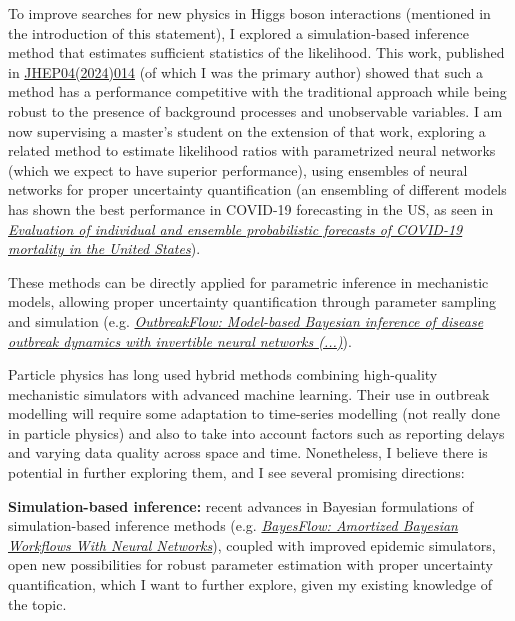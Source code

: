 \documentclass[11pt, a4paper]{awesome-cv}
\begin{document}
\begin{cvletter}
To improve searches for new physics in Higgs boson interactions (mentioned in the introduction of this statement), I explored a simulation-based inference method that estimates sufficient statistics of the likelihood. This work, published in \href{http://dx.doi.org/10.1007/JHEP04(2024)014}{JHEP04(2024)014} (of which I was the primary author) showed that such a method has a performance competitive with the traditional approach while being robust to the presence of background processes and unobservable variables. I am now supervising a master's student on the extension of that work, exploring a related method to estimate likelihood ratios with parametrized neural networks (which we expect to have superior performance), using ensembles of neural networks for proper uncertainty quantification (an ensembling of different models has shown the best performance in COVID-19 forecasting in the US, as seen in \href{https://www.pnas.org/doi/full/10.1073/pnas.2113561119?doi=10.1073%2Fpnas.2113561119}{\textit{Evaluation of individual and ensemble probabilistic forecasts of COVID-19 mortality in the United States}}). 

These methods can be directly applied for parametric inference in mechanistic models, allowing proper uncertainty quantification through parameter sampling and simulation (e.g. \href{https://journals.plos.org/ploscompbiol/article?id=10.1371/journal.pcbi.1009472}{\textit{OutbreakFlow: Model-based Bayesian inference of disease outbreak dynamics with invertible neural networks (...)}}). 


Particle physics has long used hybrid methods combining high-quality mechanistic simulators with advanced machine learning. Their use in outbreak modelling will require some adaptation to time-series modelling (not really done in particle physics) and also to take into account factors such as reporting delays and varying data quality across space and time. Nonetheless, I believe there is potential in further exploring them, and I see several promising directions:

\textbf{Simulation-based inference:} recent advances in Bayesian formulations of simulation-based inference methods (e.g. \href{https://arxiv.org/abs/2306.16015}{\textit{BayesFlow: Amortized Bayesian Workflows With Neural Networks}}), coupled with improved epidemic simulators, open new possibilities for robust parameter estimation with proper uncertainty quantification, which I want to further explore, given my existing knowledge of the topic.
  

\end{cvletter}
\end{document}
